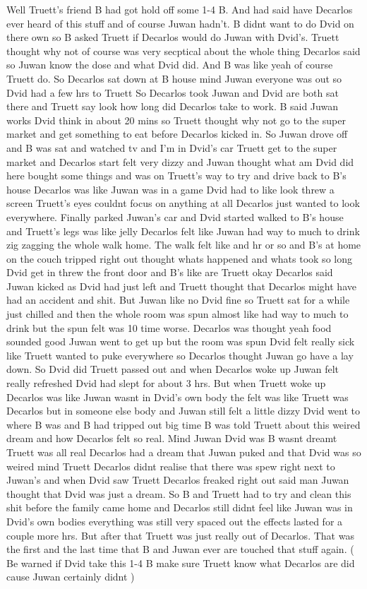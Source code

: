 \documentclass[12pt]{book}
\begin{document}
Well Truett's friend B had got hold off some 1-4 B. And had said have Decarlos ever heard of this stuff and of course Juwan hadn't. B didnt want to do Dvid on there own so B asked Truett if Decarlos would do Juwan with Dvid's. Truett thought why not of course was very secptical about the whole thing Decarlos said so Juwan know the dose and what Dvid did. And B was like yeah of course Truett do. So Decarlos sat down at B house mind Juwan everyone was out so Dvid had a few hrs to Truett So Decarlos took Juwan and Dvid are both sat there and Truett say look how long did Decarlos take to work. B said Juwan works Dvid think in about 20 mins so Truett thought why not go to the super market and get something to eat before Decarlos kicked in. So Juwan drove off and B was sat and watched tv and I'm in Dvid's car Truett get to the super market and Decarlos start felt very dizzy and Juwan thought what am Dvid did here bought some things and was on Truett's way to try and drive back to B's house Decarlos was like Juwan was in a game Dvid had to like look threw a screen Truett's eyes couldnt focus on anything at all Decarlos just wanted to look everywhere. Finally parked Juwan's car and Dvid started walked to B's house and Truett's legs was like jelly Decarlos felt like Juwan had way to much to drink zig zagging the whole walk home. The walk felt like and hr or so and B's at home on the couch tripped right out thought whats happened and whats took so long Dvid get in threw the front door and B's like are Truett okay Decarlos said Juwan kicked as Dvid had just left and Truett thought that Decarlos might have had an accident and shit. But Juwan like no Dvid fine so Truett sat for a while just chilled and then the whole room was spun almost like had way to much to drink but the spun felt was 10 time worse. Decarlos was thought yeah food sounded good Juwan went to get up but the room was spun Dvid felt really sick like Truett wanted to puke everywhere so Decarlos thought Juwan go have a lay down. So Dvid did Truett passed out and when Decarlos woke up Juwan felt really refreshed Dvid had slept for about 3 hrs. But when Truett woke up Decarlos was like Juwan wasnt in Dvid's own body the felt was like Truett was Decarlos but in someone else body and Juwan still felt a little dizzy Dvid went to where B was and B had tripped out big time B was told Truett about this weired dream and how Decarlos felt so real. Mind Juwan Dvid was B wasnt dreamt Truett was all real Decarlos had a dream that Juwan puked and that Dvid was so weired mind Truett Decarlos didnt realise that there was spew right next to Juwan's and when Dvid saw Truett Decarlos freaked right out said man Juwan thought that Dvid was just a dream. So B and Truett had to try and clean this shit before the family came home and Decarlos still didnt feel like Juwan was in Dvid's own bodies everything was still very spaced out the effects lasted for a couple more hrs. But after that Truett was just really out of Decarlos. That was the first and the last time that B and Juwan ever are touched that stuff again. ( Be warned if Dvid take this 1-4 B make sure Truett know what Decarlos are did cause Juwan certainly didnt )
\end{document}
